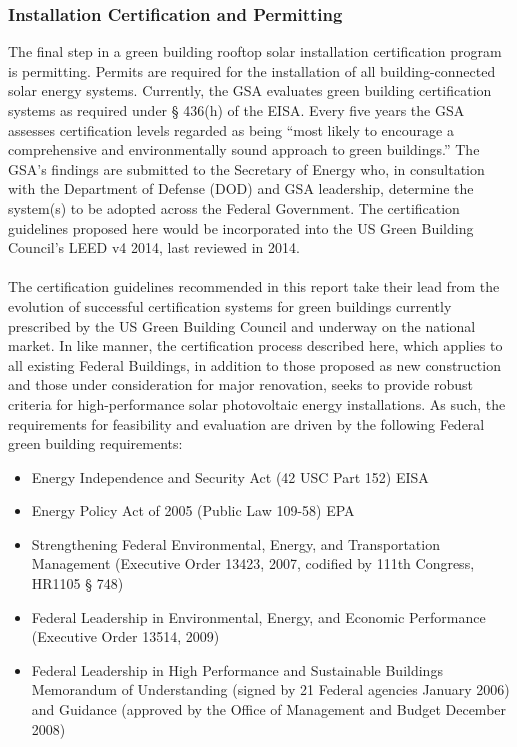 \subsubsection{Installation Certification and Permitting}
The final step in a green building rooftop solar installation certification program is permitting. Permits are required for the installation of all building-connected solar energy systems. Currently, the GSA evaluates green building certification systems as required under § 436(h) of the EISA. Every five years the GSA assesses certification levels regarded as being “most likely to encourage a comprehensive and environmentally sound approach to green buildings.” The GSA’s findings are submitted to the Secretary of Energy who, in consultation with the Department of Defense (DOD) and GSA leadership, determine the system(s) to be adopted across the Federal Government. The certification guidelines proposed here would be incorporated into the US Green Building Council’s LEED v4 2014, last reviewed in 2014.
\\\\
\noindent The certification guidelines recommended in this report take their lead from the evolution of successful certification systems for green buildings currently prescribed by the US Green Building Council and underway on the national market. In like manner, the certification process described here, which applies to all existing Federal Buildings, in addition to those proposed as new construction and those under consideration for major renovation, seeks to provide robust criteria for high-performance solar photovoltaic energy installations. As such, the requirements for feasibility and evaluation are driven by the following Federal green building requirements:
\begin{itemize}
\item Energy Independence and Security Act (42 USC Part 152) EISA
\item Energy Policy Act of 2005 (Public Law 109-58) EPA
\item Strengthening Federal Environmental, Energy, and Transportation Management (Executive Order 13423, 2007, codified by 111th Congress, HR1105 § 748)
\item Federal Leadership in Environmental, Energy, and Economic Performance (Executive Order 13514, 2009)
\item Federal Leadership in High Performance and Sustainable Buildings Memorandum of Understanding (signed by 21 Federal agencies January 2006) and Guidance (approved by the Office of Management and Budget December 2008)
\end{itemize}

